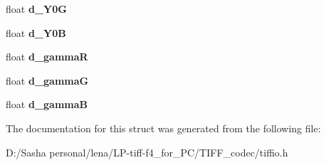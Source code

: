 \begin{DoxyCompactItemize}
\item 
\hypertarget{struct_t_i_f_f_display_a8cb8b69f2ea8bb8a51ae6e1c98cf704c}{}float {\bfseries d\+\_\+\+Y0\+G}\label{struct_t_i_f_f_display_a8cb8b69f2ea8bb8a51ae6e1c98cf704c}

\item 
\hypertarget{struct_t_i_f_f_display_a0a043e71cb11719b16605b2081c92fae}{}float {\bfseries d\+\_\+\+Y0\+B}\label{struct_t_i_f_f_display_a0a043e71cb11719b16605b2081c92fae}

\item 
\hypertarget{struct_t_i_f_f_display_ac0d7ebf9ee1482e23ce1c08c82a199ea}{}float {\bfseries d\+\_\+gamma\+R}\label{struct_t_i_f_f_display_ac0d7ebf9ee1482e23ce1c08c82a199ea}

\item 
\hypertarget{struct_t_i_f_f_display_aa95f141f902b9f312361b09d505879f5}{}float {\bfseries d\+\_\+gamma\+G}\label{struct_t_i_f_f_display_aa95f141f902b9f312361b09d505879f5}

\item 
\hypertarget{struct_t_i_f_f_display_a664d9fa3a4fd008883e99e8aa33b0590}{}float {\bfseries d\+\_\+gamma\+B}\label{struct_t_i_f_f_display_a664d9fa3a4fd008883e99e8aa33b0590}

\end{DoxyCompactItemize}


The documentation for this struct was generated from the following file\+:\begin{DoxyCompactItemize}
\item 
D\+:/\+Sasha personal/lena/\+L\+P-\/tiff-\/f4\+\_\+for\+\_\+\+P\+C/\+T\+I\+F\+F\+\_\+codec/tiffio.\+h\end{DoxyCompactItemize}

